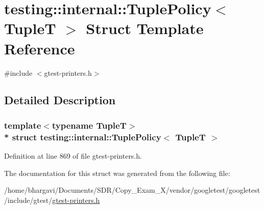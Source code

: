 \hypertarget{structtesting_1_1internal_1_1_tuple_policy}{}\section{testing\+:\+:internal\+:\+:Tuple\+Policy$<$ TupleT $>$ Struct Template Reference}
\label{structtesting_1_1internal_1_1_tuple_policy}


{\ttfamily \#include $<$gtest-\/printers.\+h$>$}



\subsection{Detailed Description}
\subsubsection*{template$<$typename TupleT$>$\\*
struct testing\+::internal\+::\+Tuple\+Policy$<$ Tuple\+T $>$}



Definition at line 869 of file gtest-\/printers.\+h.



The documentation for this struct was generated from the following file\+:\begin{DoxyCompactItemize}
\item 
/home/bhargavi/\+Documents/\+S\+D\+R/\+Copy\+\_\+\+Exam\+\_\+X/vendor/googletest/googletest/include/gtest/\hyperlink{gtest-printers_8h}{gtest-\/printers.\+h}\end{DoxyCompactItemize}
